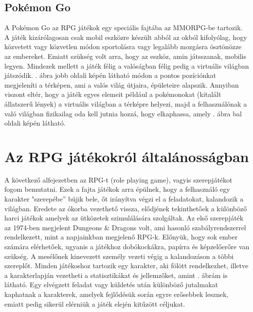 \subsection{Pokémon Go}
\label{pokemongo}

A Pokémon Go az RPG játékok egy speciális fajtába az MMORPG-be tartozik. 
A játék kizárólagosan csak mobil eszközre készült abból az okból kifolyólag, hogy közvetett vagy közvetlen módon sportolásra vagy legalább mozgásra ösztönözze az embereket. 
Emiatt szükség volt arra, hogy az eszköz, amin játsszanak, mobilis legyen. 
Mindezek mellett a játék félig a valóságban félig pedig a virtuális világban játszódik. 
. ábra jobb oldali képén látható módon a pontos pozíciónkat megjeleníti a térképen, ami a valós világ útjaira, épületeire alapszik. 
Annyiban viszont eltér, hogy a játék egyes elemeit például a pokémonokat (kitalált állatszerű lények) a virtuális világban a térképre helyezi, majd a felhasználónak a való világban fizikailag oda kell jutnia hozzá, hogy elkaphassa, amely . ábra bal oldali képén látható. 


\section{Az RPG játékokról általánosságban}
\label{rpgaltalanos}

A következő alfejezetben az RPG-t (role playing game), vagyis szerepjátékot fogom bemutatni. 
Ezek a fajta játékok arra épülnek, hogy a felhasználó egy karakter "szerepébe” bújik bele, őt irányítva végzi el a feladatokat, kalandozik a világban. 
Eredete az ókorba vezethető vissza, elődjének tekinthetőek a különböző harci játékok amelyek az ütközetek szimulálására szolgáltak. 
Az első szerepjáték az 1974-ben megjelent Dungeons \& Dragons volt, ami hasonló szabályrendszerrel rendelkezett, mint a napjainkban megjelenő RPG-k. 
Előnyük, hogy sok ember számára elérhetőek, ugyanis a játékhoz dobókockákra, papírra és képzelőerőre van szükség. 
A mesélőnek kinevezett személy vezeti végig a kalandozáson a többi szereplőt. 
Minden játékoshoz tartozik egy karakter, aki fölött rendelkezhet, illetve a karakterlapján vezetheti a statisztikákat és jellemzőket, amint . ábrám is látható. 
Egy elvégzett feladat vagy küldetés után különböző jutalmakat kaphatnak a karakterek, amelyek fejlődésük során egyre erősebbek lesznek, emiatt pedig sikerül elérniük a játék elején kitűzött céljukat. 

